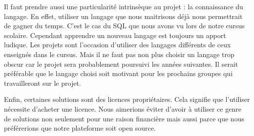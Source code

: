     Il faut prendre aussi une particularité intrinsèque au projet : la connaissance du langage.
    En effet, utiliser un langage que nous maitrisons déjà nous permettrait de gagner du temps.
    C’est le cas du SQL que nous avons vu lors de notre cursus scolaire. Cependant apprendre
    un nouveau langage est toujours un apport ludique. Les projets sont l’occasion d’utiliser
    des langages différents de ceux enseignés dans le cursus. Mais il ne faut pas non plus choisir
    un langage trop obscur car le projet sera probablement poursuivi les années suivantes.
    Il serait préférable que le langage choisi soit motivant pour les prochains groupes qui travailleront sur le projet.

    Enfin, certaines solutions sont des licences propriétaires. Cela signifie que l’utiliser nécessite
    d’acheter une licence. Nous aimerions éviter d’avoir à utiliser ce genre de solutions non seulement
    pour une raison financière mais aussi parce que nous préférerions  que notre plateforme soit open source.
